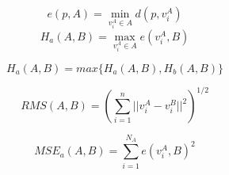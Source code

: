 \begin{equation}
e(p, A) = \min_{v^A_i\in A}{d(p, v^A_i)}
\end{equation}
\begin{equation}
H_a(A,B) = \max_{v^A_i\in A}{e(v^A_i, B)}
\end{equation}

\begin{equation}
H_a(A,B) = max\{ H_a(A,B), H_b(A,B) \}
\end{equation}

\begin{equation}
RMS(A,B) = (\sum_{i=1}^n{||v^A_i-v^B_i||^2})^{1/2}
\end{equation}

\begin{equation}
MSE_a(A,B) = \sum_{i=1}^{N_A}{e(v^A_i, B)^2}
\end{equation}